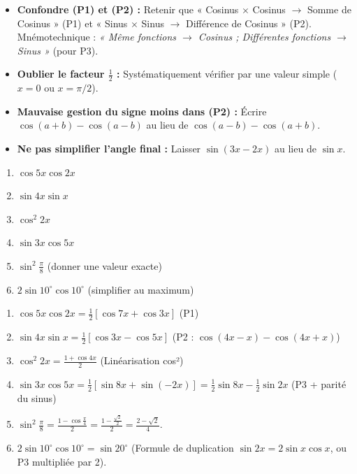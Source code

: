 \documentclass[11pt]{article}
\begin{document}
\begin{attention}
\begin{itemize}
    \item \textbf{Confondre (P1) et (P2) :} Retenir que « Cosinus $\times$ Cosinus $\to$ Somme de Cosinus » (P1) et « Sinus $\times$ Sinus $\to$ Différence de Cosinus » (P2). Mnémotechnique : \emph{« Même fonctions $\to$ Cosinus ; Différentes fonctions $\to$ Sinus »} (pour P3).
    \item \textbf{Oublier le facteur $\frac{1}{2}$ :} Systématiquement vérifier par une valeur simple ($x=0$ ou $x=\pi/2$).
    \item \textbf{Mauvaise gestion du signe moins dans (P2) :} Écrire $\cos(a+b) - \cos(a-b)$ au lieu de $\cos(a-b) - \cos(a+b)$.
    \item \textbf{Ne pas simplifier l'angle final :} Laisser $\sin(3x-2x)$ au lieu de $\sin x$.
\end{itemize}
\end{attention}

\begin{exercice}
\begin{enumerate}
    \item $\cos 5x \cos 2x$
    \item $\sin 4x \sin x$
    \item $\cos^2 2x$
    \item $\sin 3x \cos 5x$
    \item $\sin^2 \frac{\pi}{8}$ (donner une valeur exacte)
    \item $2 \sin 10^\circ \cos 10^\circ$ (simplifier au maximum)
\end{enumerate}
\end{exercice}

\begin{corrige}[Exercice n°1]
\begin{enumerate}
    \item $\cos 5x \cos 2x = \frac{1}{2}[\cos 7x + \cos 3x]$ \quad (P1)
    \item $\sin 4x \sin x = \frac{1}{2}[\cos 3x - \cos 5x]$ \quad (P2 : $\cos(4x-x) - \cos(4x+x)$)
    \item $\cos^2 2x = \frac{1+\cos 4x}{2}$ \quad (Linéarisation cos²)
    \item $\sin 3x \cos 5x = \frac{1}{2}[\sin 8x + \sin(-2x)] = \frac{1}{2}\sin 8x - \frac{1}{2}\sin 2x$ \quad (P3 + parité du sinus)
    \item $\sin^2 \frac{\pi}{8} = \frac{1-\cos\frac{\pi}{4}}{2} = \frac{1-\frac{\sqrt{2}}{2}}{2} = \frac{2-\sqrt{2}}{4}$.
    \item $2 \sin 10^\circ \cos 10^\circ = \sin 20^\circ$ \quad (Formule de duplication $\sin 2x = 2\sin x \cos x$, ou P3 multipliée par 2).
\end{enumerate}
\end{corrige}
\end{document}
